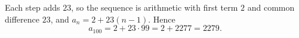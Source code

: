 Each step adds $23$, so the sequence is arithmetic with first term $2$ and common difference $23$, and $a_n=2+23(n-1)$. Hence
\[a_{100}=2+23\cdot99=2+2277=\boxed{2279}.\]
